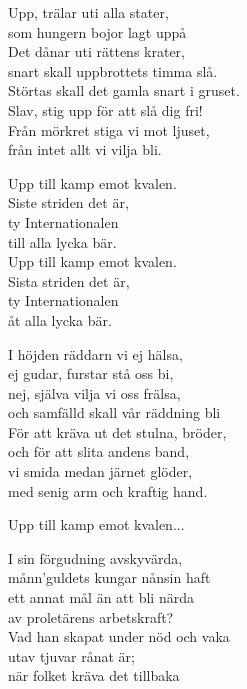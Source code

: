 \par
\vspace{10pt}
Upp, trälar uti alla stater,\\
som hungern bojor lagt uppå\\
Det dånar uti rättens krater,\\
snart skall uppbrottets timma slå.\\
Störtas skall det gamla snart i gruset.\\
Slav, stig upp för att slå dig fri!\\
Från mörkret stiga vi mot ljuset,\\
från intet allt vi vilja bli.\par
\vspace{10pt}
Upp till kamp emot kvalen.\\
Siste striden det är,\\
ty Internationalen\\
till alla lycka bär.\\
Upp till kamp emot kvalen.\\
Sista striden det är,\\
ty Internationalen\\
åt alla lycka bär.\par
\vspace{10pt}
I höjden räddarn vi ej hälsa,\\
ej gudar, furstar stå oss bi,\\
nej, själva vilja vi oss frälsa,\\
och samfälld skall vår räddning bli\\
För att kräva ut det stulna, bröder,\\
och för att slita andens band,\\
vi smida medan järnet glöder,\\
med senig arm och kraftig hand.\par
\vspace{10pt}
Upp till kamp emot kvalen...\par
\newpage
I sin förgudning avskyvärda,\\
månn'guldets kungar nånsin haft\\
ett annat mål än att bli närda\\
av proletärens arbetskraft?\\
Vad han skapat under nöd och vaka\\
utav tjuvar rånat är;\\
när folket kräva det tillbaka\\
